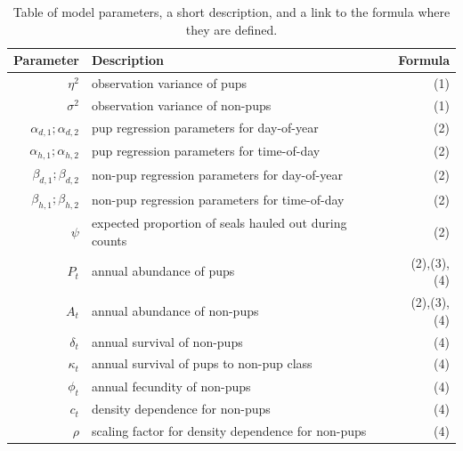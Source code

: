 \documentclass[12pt, titlepage]{article}\usepackage[]{graphicx}\usepackage[]{color}
\begin{document}
\begin{table}[ht] 
\caption{Table of model parameters, a short description, and a link to the formula where they are defined. \label{tab:parms}}
\centering
\begin{tabular}{rlr}
  \hline
  \hline
  Parameter & Description & Formula \\ 
  \hline
  \hline
  $\eta^2$ & observation variance of pups &  (1) \\ 
  $\sigma^2$ & observation variance of non-pups &  (1) \\  
  $\alpha_{d,1}; \alpha_{d,2}$ & pup regression parameters for day-of-year & (2)   \\  
  $\alpha_{h,1}; \alpha_{h,2}$ & pup regression parameters for time-of-day & (2)   \\  
  $\beta_{d,1}; \beta_{d,2}$ & non-pup regression parameters for day-of-year & (2)   \\  
  $\beta_{h,1}; \beta_{h,2}$ & non-pup regression parameters for time-of-day & (2) \\ 
  $\psi$ & expected proportion of seals hauled out during counts & (2) \\
  $P_t$ & annual abundance of pups  & (2),(3),(4)   \\  
  $A_t$ & annual abundance of non-pups & (2),(3),(4)   \\
  $\delta_t$ & annual survival of non-pups & (4) \\
  $\kappa_t$ & annual survival of pups to non-pup class & (4) \\
  $\phi_t$ & annual fecundity of non-pups & (4) \\
  $c_t$ & density dependence for non-pups & (4) \\
  $\rho$ & scaling factor for density dependence for non-pups & (4) \\
  \hline
\end{tabular}
\end{table}
\end{document}
